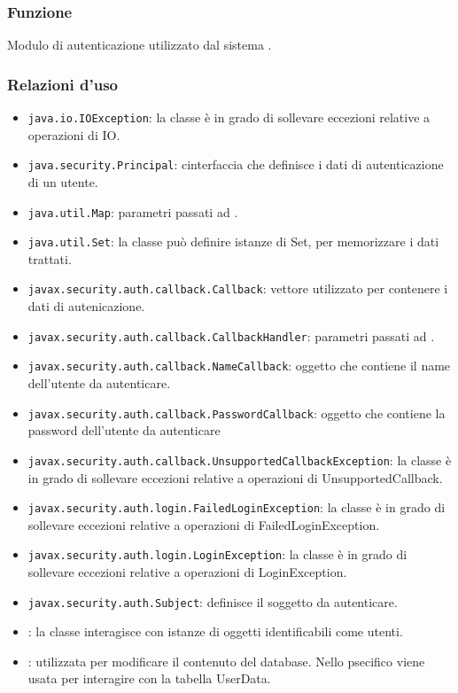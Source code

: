 

\subsubsection*{Funzione}
Modulo di autenticazione utilizzato dal sistema \caName.

\subsubsection*{Relazioni d'uso}
\begin{itemize}
	\item \texttt{java.io.IOException}: la classe è in grado di sollevare eccezioni relative a operazioni di IO.
	\item \texttt{java.security.Principal}: cinterfaccia che definisce i dati di autenticazione di un utente.
	\item \texttt{java.util.Map}: parametri passati ad .
	\item \texttt{java.util.Set}: la classe può definire istanze di Set, per memorizzare i dati trattati.
	\item \texttt{javax.security.auth.callback.Callback}: vettore utilizzato per contenere i dati di autenicazione.
	\item \texttt{javax.security.auth.callback.CallbackHandler}: parametri passati ad .
	\item \texttt{javax.security.auth.callback.NameCallback}: oggetto che contiene il name dell'utente da autenticare.
	\item \texttt{javax.security.auth.callback.PasswordCallback}: oggetto che contiene la password dell'utente da autenticare
	\item \texttt{javax.security.auth.callback.UnsupportedCallbackException}: la classe è in grado di sollevare eccezioni relative a operazioni di UnsupportedCallback.
	\item \texttt{javax.security.auth.login.FailedLoginException}: la classe è in grado di sollevare eccezioni relative a operazioni di FailedLoginException.
	\item \texttt{javax.security.auth.login.LoginException}: la classe è in grado di sollevare eccezioni relative a operazioni di LoginException.
	\item \texttt{javax.security.auth.Subject}: definisce il soggetto da autenticare.
	\item {}: la classe interagisce con istanze di oggetti identificabili come utenti.
	\item {}: utilizzata per modificare il contenuto del database. Nello psecifico viene usata per interagire con la tabella UserData.
\end{itemize}

